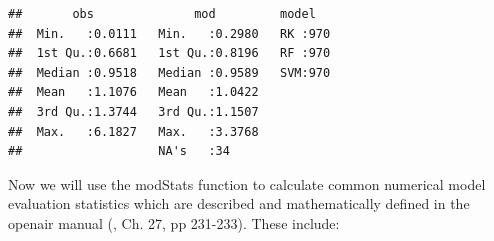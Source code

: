 \documentclass[10pt,b5paper,]{book}
\newenvironment{Shaded}{\begin{snugshade}}{\end{snugshade}}
\newcommand{\CommentTok}[1]{\textcolor[rgb]{0.56,0.35,0.01}{\textit{#1}}}
\newcommand{\DataTypeTok}[1]{\textcolor[rgb]{0.13,0.29,0.53}{#1}}
\newcommand{\KeywordTok}[1]{\textcolor[rgb]{0.13,0.29,0.53}{\textbf{#1}}}
\newcommand{\NormalTok}[1]{#1}
\newcommand{\OperatorTok}[1]{\textcolor[rgb]{0.81,0.36,0.00}{\textbf{#1}}}
\newcommand{\StringTok}[1]{\textcolor[rgb]{0.31,0.60,0.02}{#1}}
\theoremstyle{definition}
\theoremstyle{definition}
\theoremstyle{definition}
\theoremstyle{remark}
\begin{document}
\begin{Shaded}
\end{Shaded}

\begin{verbatim}
##       obs              mod         model    
##  Min.   :0.0111   Min.   :0.2980   RK :970  
##  1st Qu.:0.6681   1st Qu.:0.8196   RF :970  
##  Median :0.9518   Median :0.9589   SVM:970  
##  Mean   :1.1076   Mean   :1.0422            
##  3rd Qu.:1.3744   3rd Qu.:1.1507            
##  Max.   :6.1827   Max.   :3.3768            
##                   NA's   :34
\end{verbatim}

Now we will use the modStats function to calculate common numerical
model evaluation statistics which are described and mathematically
defined in the openair manual (\citet{carslaw2015openair}, Ch. 27, pp
231-233). These include:
\end{document}
